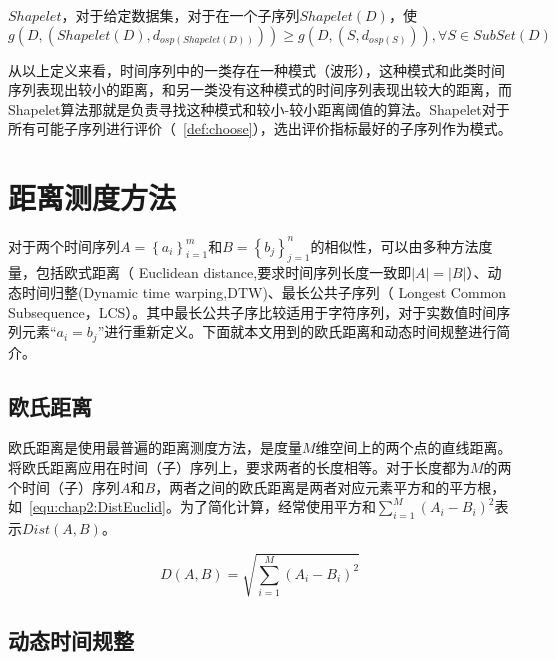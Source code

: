 \begin{definition}
	\label{def:choose}
	$Shapelet$，对于给定数据集，对于在一个子序列$Shapelet(D)$，使$g(D,(Shapelet(D),d_{osp(Shapelet(D))})) \geq g(D,(S,d_{osp(S)})),\forall S\in SubSet(D)$
\end{definition}

从以上定义来看，时间序列中的一类存在一种模式（波形），这种模式和此类时间序列表现出较小的距离，和另一类没有这种模式的时间序列表现出较大的距离，而Shapelet算法那就是负责寻找这种模式和较小-较小距离阈值的算法。Shapelet对于所有可能子序列进行评价（~\ref{def:choose}），选出评价指标最好的子序列作为模式。


\section{距离测度方法}
\label{cha:chap02:Distance}
对于两个时间序列$A=\left\lbrace a_i\right\rbrace_{i=1}^m$和$B=\left\lbrace b_j\right\rbrace_{j=1}^n$的相似性，可以由多种方法度量，包括欧式距离（ Euclidean distance,要求时间序列长度一致即$|A| = |B|$）、动态时间归整(Dynamic time warping,DTW)、最长公共子序列（ Longest Common Subsequence，LCS）。其中最长公共子序比较适用于字符序列，对于实数值时间序列元素“$a_i=b_j$”进行重新定义。下面就本文用到的欧氏距离和动态时间规整进行简介。
\subsection{欧氏距离}
欧氏距离是使用最普遍的距离测度方法，是度量$M$维空间上的两个点的直线距离。将欧氏距离应用在时间（子）序列上，要求两者的长度相等。对于长度都为$M$的两个时间（子）序列$A$和$B$，两者之间的欧氏距离是两者对应元素平方和的平方根，如~\ref{equ:chap2:DistEuclid}。为了简化计算，经常使用平方和$\sum_{i=1}^{M}(A_i-B_i)^2$表示$Dist(A,B)$。


\begin{equation}
\label{equ:chap2:DistEuclid}
D(A,B) = \sqrt{\sum_{i=1}^{M}(A_i-B_i)^2}
\end{equation}
\subsection{动态时间规整}


